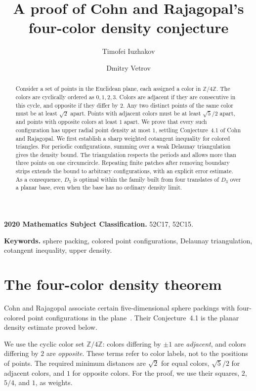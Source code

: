 \documentclass[11pt,a4paper]{article}
\title{A proof of Cohn and Rajagopal's four-color density conjecture}
\author{Timofei Iuzhakov \and Dmitry Vetrov}
\date{}
\theoremstyle{definition}
\theoremstyle{remark}
\newcommand{\Z}{\mathbb{Z}}
\begin{document}
\maketitle

\begin{abstract}
Consider a set of points in the Euclidean plane, each assigned a color in
$\Z/4\Z$. The colors are cyclically ordered as $0,1,2,3$. Colors are
adjacent if they are consecutive in this cycle, and opposite if they
differ by $2$. Any two distinct points of the same color must be at least
$\sqrt2$ apart. Points with adjacent colors must be at least $\sqrt5/2$
apart, and points with opposite colors at least $1$ apart. We prove that
every such configuration has upper radial point density at most $1$,
settling Conjecture~4.1 of Cohn and Rajagopal. We first establish a sharp
weighted cotangent inequality for colored triangles. For periodic
configurations, summing over a weak Delaunay triangulation gives the
density bound. The triangulation respects the periods and allows more
than three points on one circumcircle. Repeating finite patches after
removing boundary strips extends the bound to arbitrary configurations,
with an explicit error estimate. As a consequence, $D_5$ is optimal
within the family built from four translates of $D_3$ over a planar base,
even when the base has no ordinary density limit.
\end{abstract}

\noindent\textbf{2020 Mathematics Subject Classification.} 52C17, 52C15.

\noindent\textbf{Keywords.} sphere packing, colored point configurations, Delaunay triangulation,
cotangent inequality, upper density.


\section{The four-color density theorem}
\label{sec:introduction}

Cohn and Rajagopal associate certain five-dimensional sphere packings with
four-colored point configurations in the plane~\cite[Section~4.1]{CR}.
Their Conjecture~4.1 is the planar density estimate proved below.

We use the cyclic color set $\Z/4\Z$: colors differing by $\pm1$ are
\emph{adjacent}, and colors differing by $2$ are \emph{opposite}.
These terms refer to color labels, not to the positions of points.
The required minimum distances are $\sqrt2$ for equal colors,
$\sqrt5/2$ for adjacent colors, and $1$ for opposite colors.
For the proof, we use their squares, $2$, $5/4$, and $1$, as weights.
\end{document}
